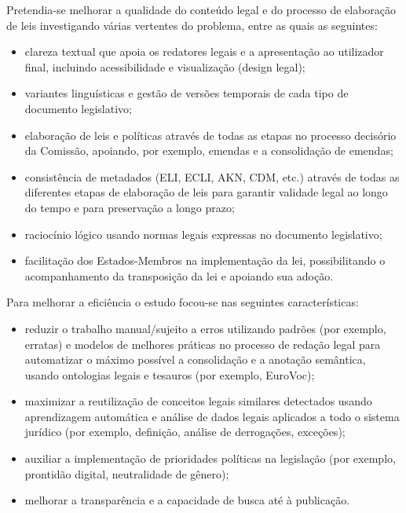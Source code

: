 Pretendia-se melhorar a qualidade do conteúdo legal e do processo de elaboração de leis 
investigando várias vertentes do problema, entre as quais as seguintes:

\begin{itemize}

\item clareza textual que apoia os redatores legais e a apresentação ao utilizador final, 
incluindo acessibilidade e visualização (design legal);
\item variantes linguísticas e gestão de versões temporais de cada tipo de documento legislativo;
\item elaboração de leis e políticas através de todas as etapas no processo decisório da Comissão, 
apoiando, por exemplo, emendas e a consolidação de emendas;
\item consistência de metadados (ELI, ECLI, AKN, CDM, etc.) através de todas as diferentes etapas 
de elaboração de leis para garantir validade legal ao longo do tempo e para preservação a longo prazo;
\item raciocínio lógico usando normas legais expressas no documento legislativo; 
\item facilitação dos Estados-Membros na implementação da lei, possibilitando o acompanhamento da 
transposição da lei e apoiando sua adoção.

\end{itemize}

Para melhorar a eficiência o estudo focou-se nas seguintes características:

\begin{itemize}

\item reduzir o trabalho manual/sujeito a erros utilizando padrões (por exemplo, erratas) e modelos 
de melhores práticas no processo de redação legal para automatizar o máximo possível a consolidação 
e a anotação semântica, usando ontologias legais e tesauros (por exemplo, EuroVoc);
\item maximizar a reutilização de conceitos legais similares detectados usando aprendizagem automática 
e análise de dados legais aplicados a todo o sistema jurídico (por exemplo, definição, 
análise de derrogações, exceções);
\item auxiliar a implementação de prioridades políticas na legislação (por exemplo, prontidão digital, 
neutralidade de gênero); 
\item melhorar a transparência e a capacidade de busca até à publicação.

\end{itemize}

